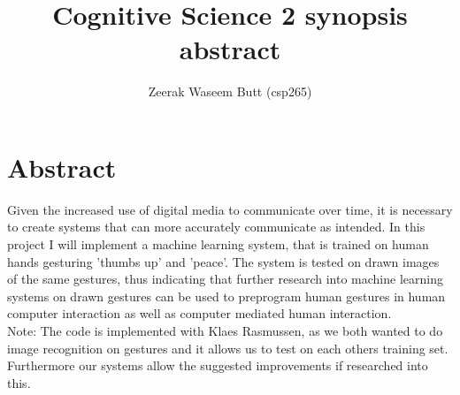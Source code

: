 \documentclass[10pt, a4paper]{article}
\begin{document}
\title{Cognitive Science 2 synopsis abstract}
\author{Zeerak Waseem Butt (csp265)}
\date{}
\maketitle
\section{Abstract}
Given the increased use of digital media to communicate over time, it is necessary to create systems that can more accurately communicate as intended. In this project I will implement a machine learning system, that is trained on human hands gesturing 'thumbs up' and 'peace'. The system is tested on drawn images of the same gestures, thus indicating that further research into machine learning systems on drawn gestures can be used to preprogram human gestures in human computer interaction as well as computer mediated human interaction.\\

Note: The code is implemented with Klaes Rasmussen, as we both wanted to do image recognition on gestures and it allows us to test on each others training set. Furthermore our systems allow the suggested improvements if researched into this.



\nocite{*}
\end{document}
